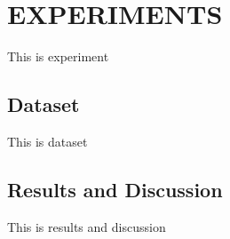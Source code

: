 \section{EXPERIMENTS}
\label{sec:exp}
This is experiment

\subsection{Dataset}
\label{sec:dataset}

This is dataset

\subsection{Results and Discussion}
\label{subsec:results}

This is results and discussion
